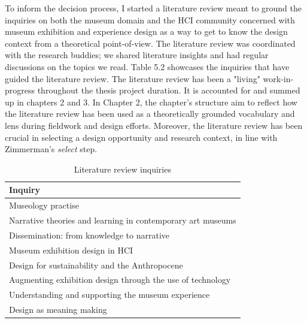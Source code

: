 To inform the decision process, I started a literature review meant to ground the inquiries on both the museum domain and the HCI community concerned with museum exhibition and experience design as a way to get to know the design context from a theoretical point-of-view. The literature review was coordinated with the research buddies; we shared literature insights and had regular discussions on the topics we read. Table 5.2 showcases the inquiries that have guided the literature review. The literature review has been a "living" work-in-progress throughout the thesis project duration. It is accounted for and summed up in chapters 2 and 3. In Chapter 2, the chapter's structure aim to reflect how the literature review has been used as a theoretically grounded vocabulary and lens during fieldwork and design efforts. Moreover, the literature review has been crucial in selecting a design opportunity and research context, in line with Zimmerman's \emph{select} step.

\begin{table}[H]
\centering
\begin{tabular}{| l |}
\hline
\textbf{Inquiry} \\
\hline
Museology practise \\
Narrative theories and learning in contemporary art museums \\
Dissemination: from knowledge to narrative \\
Museum exhibition design in HCI \\
Design for sustainability and the Anthropocene \\
Augmenting exhibition design through the use of technology \\
Understanding and supporting the museum experience \\
Design as meaning making \\
\hline
\end{tabular}
\caption{Literature review inquiries}
\end{table}

